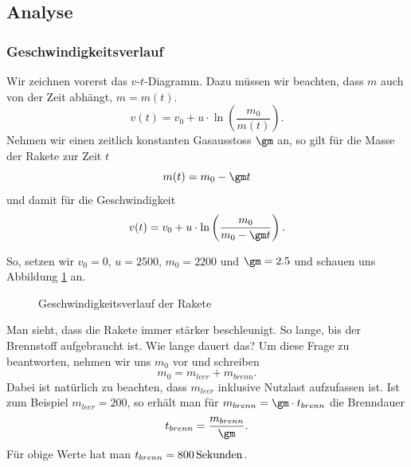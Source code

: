\documentclass[%
draft,
11pt,%
twoside,%
titlepage,%
german,%
headsepline%
]{scrartcl}
\begin{document}
\subsection{Analyse}
\subsubsection{Geschwindigkeitsverlauf}

Wir zeichnen vorerst das $v$-$t$-Diagramm. Dazu m\"ussen wir beachten, dass $m$ auch von der Zeit abh\"angt, $m=m(t)$.
$$v(t)=v_0+u\cdot\ln\left(\frac{m_0}{m(t)}\right).$$
Nehmen wir einen zeitlich konstanten Gasausstoss $\gm$ an, so gilt f\"ur die Masse der Rakete zur Zeit $t$
$$m(t)=m_0-\gm t$$
und damit f\"ur die Geschwindigkeit
$$v(t)=v_0+u\cdot\ln\left(\frac{m_0}{m_0-\gm t}\right).$$

So, setzen wir $v_0=0$, $u=2500$, $m_0=2200$ und $\gm=2.5$ und schauen uns Abbildung \ref{geschwindigkeitrakete} an.

\begin{figure}
\begin{center}
\end{center}
\caption{Geschwindigkeitsverlauf der Rakete}\label{geschwindigkeitrakete}
\end{figure}


Man sieht, dass die Rakete immer st\"arker beschleunigt. So lange, bis der Brennstoff aufgebraucht ist. Wie lange dauert das? Um diese Frage zu beantworten, nehmen wir uns $m_0$ vor und schreiben
$$m_0=m_{leer}+m_{brenn}.$$
Dabei ist nat\"urlich zu beachten, dass $m_{leer}$ inklusive Nutzlast aufzufassen ist. Ist zum Beispiel $m_{leer}=200$, so erh\"alt man f\"ur $m_{brenn}=\gm\cdot t_{brenn}$ die Brenndauer
$$t_{brenn}=\frac{m_{brenn}}{\gm}.$$
F\"ur obige Werte hat man $t_{brenn}=\unit[800]{Sekunden}$.
\end{document}
